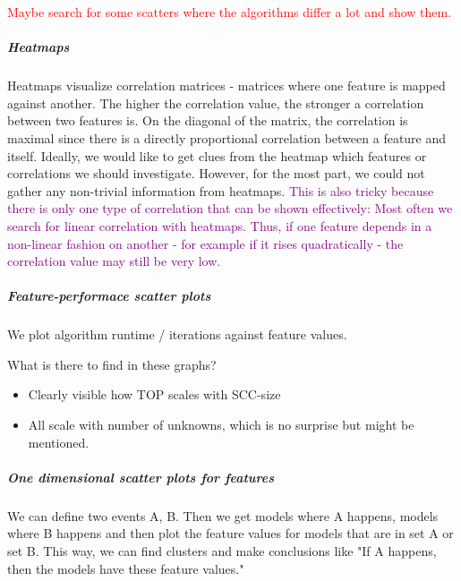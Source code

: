 \textcolor{red}{Maybe search for some scatters where the algorithms differ a lot and show them.}

\subparagraph*{Heatmaps}
Heatmaps visualize correlation matrices - matrices where one feature is mapped against another. The higher the correlation value, the stronger
a correlation between two features is. On the diagonal of the matrix, the correlation is maximal since there is a directly proportional correlation between
a feature and itself. Ideally, we would like to get clues from the heatmap which features or correlations we should investigate.
However, for the most part, we could not gather any non-trivial information from heatmaps. \textcolor{purple}{This is also tricky because
there is only one type of correlation that can be shown effectively: Most often we search for linear correlation with heatmaps. Thus,
if one feature depends in a non-linear fashion on another - for example if it rises quadratically - the correlation value may still be very low.}

\subparagraph*{Feature-performace scatter plots}
We plot algorithm runtime / iterations against feature values.

What is there to find in these graphs?
\begin{itemize}
    \item Clearly visible how TOP scales with SCC-size
    \item All scale with number of unknowns, which is no surprise but might be mentioned.
\end{itemize}

\subparagraph*{One dimensional scatter plots for features}
We can define two events A, B. Then we get models where A happens, models where B happens and then plot the feature values for models that are in set A or set B.
This way, we can find clusters and make conclusions like "If A happens, then the models have these feature values."